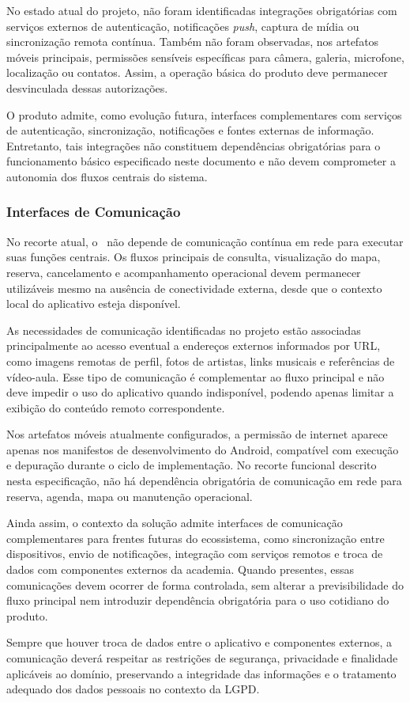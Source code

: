 No estado atual do projeto, não foram identificadas integrações obrigatórias com serviços externos de autenticação, notificações \textit{push}, captura de mídia ou sincronização remota contínua. Também não foram observadas, nos artefatos móveis principais, permissões sensíveis específicas para câmera, galeria, microfone, localização ou contatos. Assim, a operação básica do produto deve permanecer desvinculada dessas autorizações.

O produto admite, como evolução futura, interfaces complementares com serviços de autenticação, sincronização, notificações e fontes externas de informação. Entretanto, tais integrações não constituem dependências obrigatórias para o funcionamento básico especificado neste documento e não devem comprometer a autonomia dos fluxos centrais do sistema.

\subsubsection{Interfaces de Comunicação}
No recorte atual, o \ProjetoNome\ não depende de comunicação contínua em rede para executar suas funções centrais. Os fluxos principais de consulta, visualização do mapa, reserva, cancelamento e acompanhamento operacional devem permanecer utilizáveis mesmo na ausência de conectividade externa, desde que o contexto local do aplicativo esteja disponível.

As necessidades de comunicação identificadas no projeto estão associadas principalmente ao acesso eventual a endereços externos informados por URL, como imagens remotas de perfil, fotos de artistas, links musicais e referências de vídeo-aula. Esse tipo de comunicação é complementar ao fluxo principal e não deve impedir o uso do aplicativo quando indisponível, podendo apenas limitar a exibição do conteúdo remoto correspondente.

Nos artefatos móveis atualmente configurados, a permissão de internet aparece apenas nos manifestos de desenvolvimento do Android, compatível com execução e depuração durante o ciclo de implementação. No recorte funcional descrito nesta especificação, não há dependência obrigatória de comunicação em rede para reserva, agenda, mapa ou manutenção operacional.

Ainda assim, o contexto da solução admite interfaces de comunicação complementares para frentes futuras do ecossistema, como sincronização entre dispositivos, envio de notificações, integração com serviços remotos e troca de dados com componentes externos da academia. Quando presentes, essas comunicações devem ocorrer de forma controlada, sem alterar a previsibilidade do fluxo principal nem introduzir dependência obrigatória para o uso cotidiano do produto.

Sempre que houver troca de dados entre o aplicativo e componentes externos, a comunicação deverá respeitar as restrições de segurança, privacidade e finalidade aplicáveis ao domínio, preservando a integridade das informações e o tratamento adequado dos dados pessoais no contexto da LGPD.